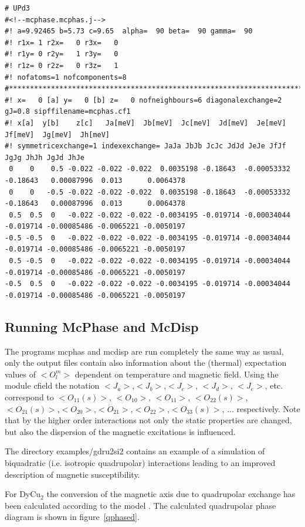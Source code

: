 {\footnotesize \begin{verbatim}
# UPd3 
#<!--mcphase.mcphas.j-->
#! a=9.92465 b=5.73 c=9.65  alpha=  90 beta=  90 gamma=  90
#! r1x= 1 r2x=   0 r3x=   0
#! r1y= 0 r2y=   1 r3y=   0
#! r1z= 0 r2z=   0 r3z=   1
#! nofatoms=1 nofcomponents=8
#*************************************************************************
#! x=   0 [a] y=   0 [b] z=   0 nofneighbours=6 diagonalexchange=2 gJ=0.8 sipffilename=mcphas.cf1
#! x[a]  y[b]    z[c]   Ja[meV]  Jb[meV]  Jc[meV]  Jd[meV]  Je[meV]  Jf[meV]  Jg[meV]  Jh[meV]
#! symmetricexchange=1 indexexchange= JaJa JbJb JcJc JdJd JeJe JfJf JgJg JhJh JgJd JhJe
 0    0    0.5 -0.022 -0.022 -0.022  0.0035198 -0.18643  -0.00053332 -0.18643   0.00087996  0.013      0.0064378
 0    0   -0.5 -0.022 -0.022 -0.022  0.0035198 -0.18643  -0.00053332 -0.18643   0.00087996  0.013      0.0064378
 0.5  0.5  0   -0.022 -0.022 -0.022 -0.0034195 -0.019714 -0.00034044 -0.019714 -0.00085486 -0.0065221 -0.0050197
-0.5 -0.5  0   -0.022 -0.022 -0.022 -0.0034195 -0.019714 -0.00034044 -0.019714 -0.00085486 -0.0065221 -0.0050197
 0.5 -0.5  0   -0.022 -0.022 -0.022 -0.0034195 -0.019714 -0.00034044 -0.019714 -0.00085486 -0.0065221 -0.0050197
-0.5  0.5  0   -0.022 -0.022 -0.022 -0.0034195 -0.019714 -0.00034044 -0.019714 -0.00085486 -0.0065221 -0.0050197
\end{verbatim} }

\subsection{Running {\prg McPhase} and {\prg McDisp}}

The programs {\prg mcphas} and {\prg mcdisp} are run completely the same way as usual, only
the output files contain also information about the (thermal) expectation values of $<O_l^m>$
dependent on temperature and magnetic field. 
Using the module cfield the notation $<J_a>$,$<J_b>$,$<J_c>$,
$<J_d>$, $<J_e>$, etc. correspond to $<O_{11}(s)>$, $<O_{10}>$,
$<O_{11}>$, $<O_{22}(s)>$, $<O_{21}(s)>$,$<O_{20}>$,$<O_{21}>$,$<O_{22}>$,$<O_{33}(s)>$, ...
 respectively.
Note that by the higher order interactions not only the static properties are changed, but also the
dispersion of the magnetic excitations is influenced.


The directory {\prg examples/gdru2si2} contains an example of a simulation of biquadratic (i.e. isotropic %
quadrupolar) interactions leading to an improved description of magnetic susceptibility.

For DyCu$_2$ the conversion
of the magnetic axis due to quadrupolar exchange has been calculated according to the model 
\cite{yoshida98-1421}. The calculated quadrupolar phase diagram is shown in figure~\ref{qphased}.

